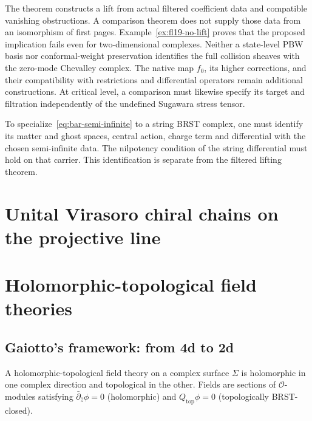 \begin{remark}
\label{rem:bar-semi-infinite-scope}
The theorem constructs a lift from actual filtered coefficient data and compatible vanishing obstructions.
A comparison theorem does not supply those data from an isomorphism of first pages.
Example~\ref{ex:fl19-no-lift} proves that the proposed implication fails even for two-dimensional complexes.
Neither a state-level PBW basis nor conformal-weight preservation identifies the full collision sheaves with the zero-mode Chevalley complex.
The native map $f_0$, its higher corrections, and their compatibility with restrictions and differential operators remain additional constructions.
At critical level, a comparison must likewise specify its target and filtration independently of the undefined Sugawara stress tensor.
\end{remark}

\begin{remark}
\label{rem:string-brst-special-case}
To specialize~\eqref{eq:bar-semi-infinite} to a string BRST complex, one must identify its matter and ghost spaces, central action, charge term and differential with the chosen semi-infinite data.
The nilpotency condition of the string differential must hold on that carrier.
This identification is separate from the filtered lifting theorem.
\end{remark}



\section{Unital Virasoro chiral chains on the projective line}
\label{sec:cbc26-unital-p1}



\section{Holomorphic-topological field theories}

\subsection{Gaiotto's framework: from 4d to 2d}

\begin{definition}
A holomorphic-topological field theory on a complex surface $\Sigma$ is holomorphic in one complex direction and topological in the other.  Fields are sections of $\mathcal{O}$-modules satisfying $\bar{\partial}_{\bar{z}} \phi = 0$ (holomorphic) and $Q_{\text{top}} \phi = 0$ (topologically BRST-closed).
\end{definition}

